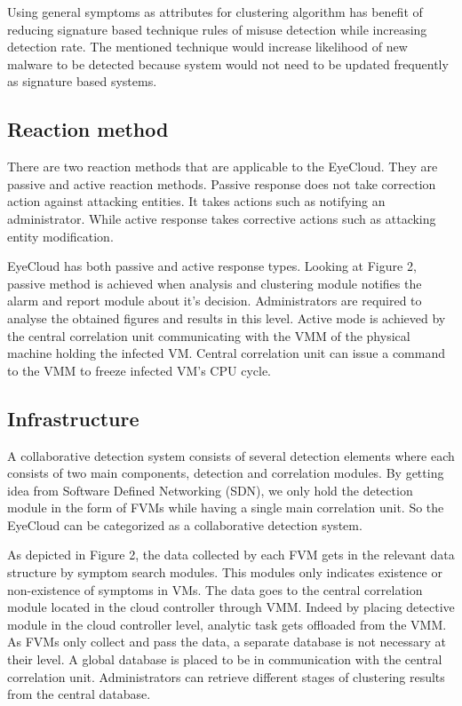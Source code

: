 \documentclass[conference]{IEEEtran}
\begin{document}
Using general symptoms as attributes for clustering algorithm has benefit of reducing signature based technique rules of misuse detection while increasing detection rate. The mentioned technique would increase likelihood of new malware to be detected because system would not need to be updated frequently as signature based systems.

\subsection{Reaction method}
There are two reaction methods that are applicable to the EyeCloud. They are passive and active reaction methods. Passive response does not take correction action against attacking entities. It takes actions such as notifying an administrator. While active response takes corrective actions such as attacking entity modification. 

EyeCloud has both passive and active response types. Looking at Figure 2, passive method is achieved when analysis and clustering module notifies the alarm and report module about it's decision. Administrators are required to analyse the obtained figures and results in this level. Active mode is achieved by the central correlation unit communicating with the VMM of the physical machine holding the infected VM. Central correlation unit can issue a command to the VMM to freeze infected VM's CPU cycle.
\subsection{Infrastructure}
A collaborative detection system consists of several detection elements where each consists of two main components, detection and correlation modules. By getting idea from Software Defined Networking (SDN), we only hold the detection module in the form of FVMs while having a single main correlation unit. So the EyeCloud can be categorized as a collaborative detection system. 

As depicted in Figure 2, the data collected by each FVM gets in the relevant data structure by symptom search modules. This modules only indicates existence or non-existence of symptoms in VMs. The data goes to the central correlation module located in the cloud controller through VMM. Indeed by placing detective module in the cloud controller level, analytic task gets offloaded from the VMM. As FVMs only collect and pass the data, a separate database is not necessary at their level. A global database is placed to be in communication with the central correlation unit. Administrators can retrieve different stages of clustering results from the central database.
 
\end{document}
